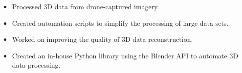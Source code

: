 \dottedline
{}
\begin{itemize}
    \item Processed 3D data from drone-captured imagery.
    \item Created automation scripts to simplify the processing of large data sets.
    \item Worked on improving the quality of 3D data reconstruction.
    \item Created an in-house Python library using the Blender API to automate 3D data processing.
\end{itemize}
